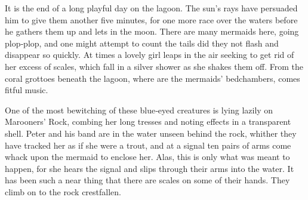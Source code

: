 

\begin{Settings}
It is the end of a long playful day on the lagoon.
The sun’s rays have persuaded him to give them another five minutes,
for one more race over the waters before he gathers them up and lets in the moon.
There are many mermaids here, going plop‐plop,
and one might attempt to count the tails did they not flash and disappear so quickly.
At times a lovely girl leaps in the air seeking to get rid of her excess of scales,
which fall in a silver shower as she shakes them off.
From the coral grottoes beneath the lagoon, where are the mermaids’ bedchambers, comes fitful music.

One of the most bewitching of these blue‐eyed creatures is lying lazily on Marooners’ Rock,
combing her long tresses and noting effects in a transparent shell.
Peter and his band are in the water unseen behind the rock,
whither they have tracked her as if she were a trout,
and at a signal ten pairs of arms come whack upon the mermaid to enclose her.
Alas, this is only what was meant to happen, for she hears the signal
and slips through their arms into the water.
It has been such a near thing that there are scales on some of their hands.
They climb on to the rock crestfallen.
\end{Settings}

